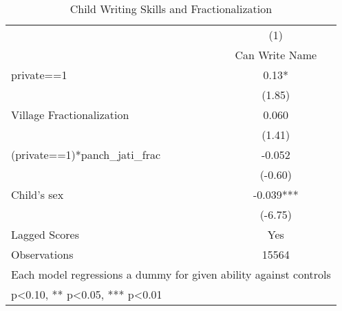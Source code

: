 \begin{table}[htbp]\centering
\def\sym#1{\ifmmode^{#1}\else\(^{#1}\)\fi}
\caption{Child Writing Skills and Fractionalization\label{indiawriting}}
\begin{tabular}{l*{1}{c}}
\toprule
                &\multicolumn{1}{c}{(1)}\\
                &\multicolumn{1}{c}{Can Write Name}\\
\midrule
private==1      &     0.13*  \\
                &   (1.85)   \\
Village Fractionalization&    0.060   \\
                &   (1.41)   \\
(private==1)*panch\_jati\_frac&   -0.052   \\
                &  (-0.60)   \\
Child's sex     &   -0.039***\\
                &  (-6.75)   \\
Lagged Scores   &      Yes   \\
\midrule
Observations    &    15564   \\
\bottomrule
\multicolumn{2}{l}{\footnotesize Each model regressions a dummy for given ability against controls}\\
\multicolumn{2}{l}{\footnotesize * p<0.10, ** p<0.05, *** p<0.01}\\
\end{tabular}
\end{table}
